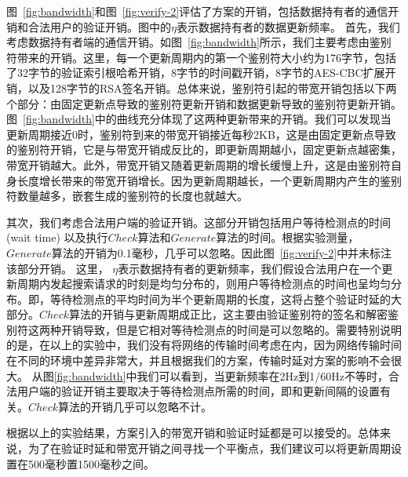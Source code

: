 图~\ref{fig:bandwidth}和图~\ref{fig:verify-2}评估了\multi 方案的开销，包括数据持有者的通信开销和合法用户的验证开销。图中的$\eta$表示数据持有者的数据更新频率。
首先，我们考虑数据持有者端的通信开销。如图~\ref{fig:bandwidth}所示，我们主要考虑由鉴别符带来的开销。这里，每一个更新周期内的第一个鉴别符大小约为176字节，包括了32字节的验证索引根哈希开销，8字节的时间戳开销，8字节的AES-CBC扩展开销，以及128字节的RSA签名开销。总体来说，鉴别符引起的带宽开销包括以下两个部分：由固定更新点导致的鉴别符更新开销和数据更新导致的鉴别符更新开销。
图~\ref{fig:bandwidth}中的曲线充分体现了这两种更新带来的开销。我们可以发现当更新周期接近0时，鉴别符到来的带宽开销接近每秒2KB，这是由固定更新点导致的鉴别符开销，它是与带宽开销成反比的，即更新周期越小，固定更新点越密集，带宽开销越大。此外，带宽开销又随着更新周期的增长缓慢上升，这是由鉴别符自身长度增长带来的带宽开销增长。因为更新周期越长，一个更新周期内产生的鉴别符数量越多，嵌套生成的鉴别符的长度也就越大。

其次，我们考虑合法用户端的验证开销。这部分开销包括用户等待检测点的时间 (wait time) 以及执行$Check$算法和$Generate$算法的时间。根据实验测量，$Generate$算法的开销为0.1毫秒，几乎可以忽略。因此图~\ref{fig:verify-2}中并未标注该部分开销。
这里， $\eta$表示数据持有者的更新频率，我们假设合法用户在一个更新周期内发起搜索请求的时刻是均匀分布的，则用户等待检测点的时间也呈均匀分布。即，等待检测点的平均时间为半个更新周期的长度，这将占整个验证时延的大部分。$Check$算法的开销与更新周期成正比，这主要由验证鉴别符的签名和解密鉴别符这两种开销导致，但是它相对等待检测点的时间是可以忽略的。需要特别说明的是，在以上的实验中，我们没有将网络的传输时间考虑在内，因为网络传输时间在不同的环境中差异非常大，并且根据我们的方案，传输时延对方案的影响不会很大。
从图\ref{fig:bandwidth}中我们可以看到，当更新频率在2Hz到1/60Hz不等时，合法用户端的验证开销主要取决于等待检测点所需的时间，即和更新间隔的设置有关。$Check$算法的开销几乎可以忽略不计。

根据以上的实验结果，\multi 方案引入的带宽开销和验证时延都是可以接受的。总体来说，为了在验证时延和带宽开销之间寻找一个平衡点，我们建议可以将更新周期设置在500毫秒置1500毫秒之间。

